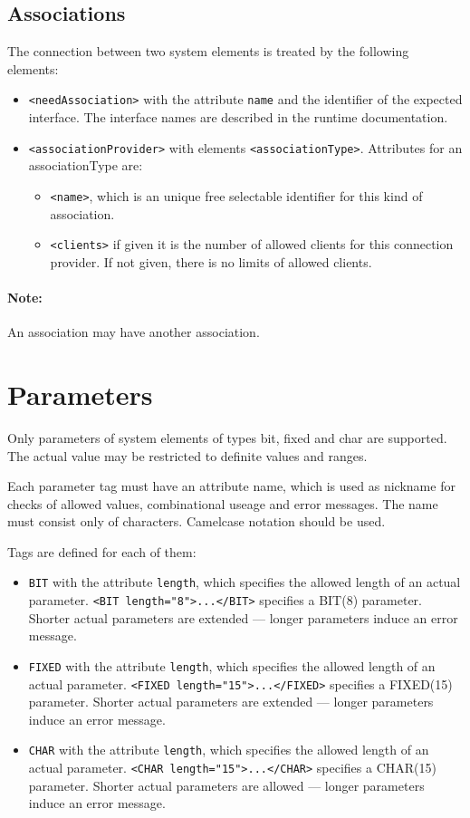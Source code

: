 \subsection{Associations}
The connection between two system elements is treated by the following
elements:

\begin{itemize}
\item \verb|<needAssociation>| with the attribute 
 \verb|name| and the identifier of the expected interface. The 
  interface names are described in the runtime documentation. 
\item \verb|<associationProvider>|  with elements \verb|<associationType>|.
  Attributes for an associationType are:
  \begin{itemize}
   \item  \verb|<name>|,  which is an unique free selectable
     identifier for this kind of  association.
   \item \verb|<clients>|  if given it is the number of allowed
      clients for this connection provider. If not given, there is no
      limits of allowed clients.
   \end{itemize} 
\end{itemize}

\paragraph{Note:} An association may have another association.
 
\section{Parameters}
Only parameters of system elements of types bit, fixed and char are supported.
The actual value may be restricted to definite values and ranges.

Each parameter tag must have an attribute name, which is used as nickname 
for checks of allowed values, combinational useage and error messages.
The name must consist only of characters. Camelcase notation should be used.

Tags are defined for each of them:
\begin{itemize}
\item \verb|BIT| with the attribute \verb|length|, which specifies the 
   allowed length of an actual parameter. \verb|<BIT length="8">...</BIT>|
   specifies a BIT(8) parameter. Shorter actual parameters are extended --- 
   longer parameters induce an error message.
\item \verb|FIXED| with the attribute \verb|length|, which specifies the 
   allowed length of an actual parameter. \verb|<FIXED length="15">...</FIXED>|
   specifies a FIXED(15) parameter. Shorter actual parameters are extended --- 
   longer parameters induce an error message.
\item \verb|CHAR| with the attribute \verb|length|, which specifies the 
   allowed length of an actual parameter. \verb|<CHAR length="15">...</CHAR>|
   specifies a CHAR(15) parameter. Shorter actual parameters are allowed --- 
   longer parameters induce an error message.
\end{itemize}

